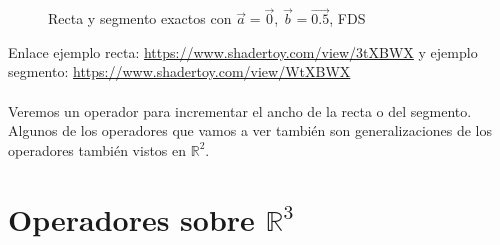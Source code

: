\begin{figure}[H]
  \centering
  \captionsetup{justification=centering}%
  \hfill
  \caption{Recta y segmento exactos con \(\Vec{a}=\Vec{0}\), \(\Vec{b}=\Vec{0.5}\), FDS}
\end{figure}
Enlace ejemplo recta: \url{https://www.shadertoy.com/view/3tXBWX} y ejemplo segmento:
\url{https://www.shadertoy.com/view/WtXBWX}\\\\
Veremos un operador para incrementar el ancho de la recta o del segmento. Algunos de los operadores que vamos a ver también son generalizaciones de los operadores también  vistos en \(\mathbb{R}^2\).

\section{Operadores sobre \(\mathbb{R}^3\)}

